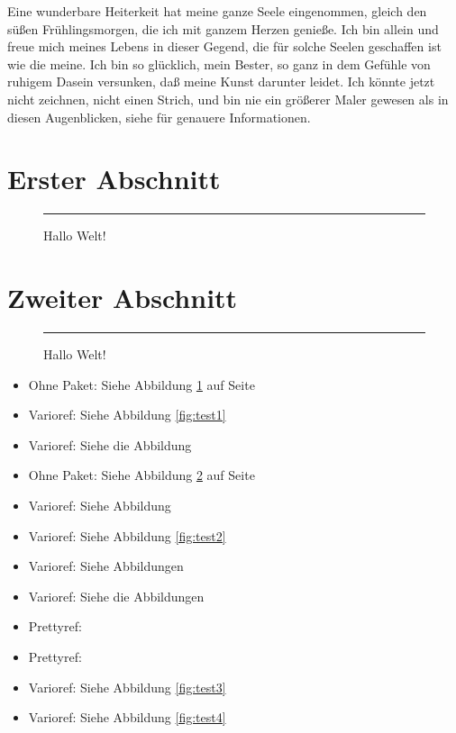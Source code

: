 \documentclass[ngerman]{scrartcl}
\begin{document}
Eine wunderbare Heiterkeit hat meine ganze Seele eingenommen, gleich den süßen Frühlingsmorgen, die ich mit ganzem Herzen genieße. 
Ich bin allein und freue mich meines Lebens in dieser Gegend, die für solche Seelen geschaffen  ist wie die meine. 
Ich bin so glücklich, mein Bester, so ganz in dem Gefühle von ruhigem Dasein versunken, daß meine Kunst darunter leidet.
Ich könnte jetzt nicht zeichnen, nicht einen Strich, und bin nie ein größerer Maler gewesen als in diesen Augenblicken, siehe für genauere Informationen. 

 
\section{Erster Abschnitt}\label{sec:erst}
 
\blindtext[3]
 
\begin{figure}[h]%
\rule{\columnwidth}{5cm}
\caption{Hallo Welt!}%
\label{fig:test1}%
\end{figure}
 
\blindtext[1]
 
\section{Zweiter Abschnitt}
 
\blindtext[5]
 
\begin{figure}%
\rule{\columnwidth}{5cm}
\caption{Hallo Welt!}%
\label{fig:test2}%
\end{figure}
 
\blindtext[4]
 
\begin{itemize}
	\item Ohne Paket: Siehe Abbildung \textcolor{red}{\ref{fig:test1}} auf Seite \textcolor{red}{\pageref{fig:test1}}
	\item Varioref: Siehe Abbildung \textcolor{red}{\vref{fig:test1}}
	\item Varioref: Siehe die Abbildung \textcolor{red}{}
	\item Ohne Paket: Siehe Abbildung \textcolor{red}{\ref{fig:test2}} auf Seite \textcolor{red}{\pageref{fig:test2}}
	\item Varioref: Siehe Abbildung \textcolor{red}{}
	\item Varioref: Siehe Abbildung \textcolor{red}{\vref{fig:test2}}
	\item Varioref: Siehe Abbildungen \textcolor{red}{}
	\item Varioref: Siehe die Abbildungen \textcolor{red}{}
	\item Prettyref: \textcolor{red}{}
	\item Prettyref: \textcolor{red}{}
	\item Varioref: Siehe Abbildung \textcolor{red}{\vref{fig:test3}}
	\item Varioref: Siehe Abbildung \textcolor{red}{\vref{fig:test4}}
\end{itemize}
 
\end{document}
